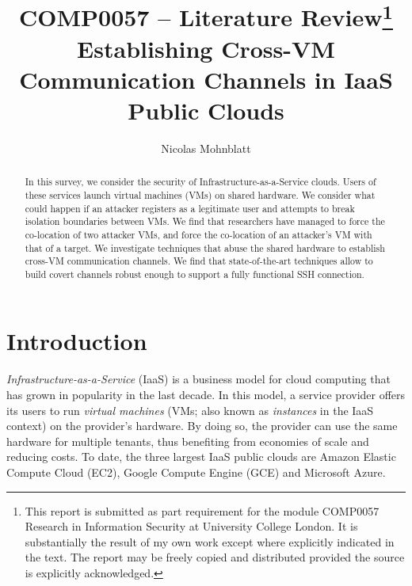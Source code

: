 \documentclass[orivec,envcountsame, a4paper, 11pt]{llncs}
\title{COMP0057 -- Literature Review\thanks{This report is submitted as part requirement for the module COMP0057 Research in Information Security at University College London. It is substantially the result of my own work except where explicitly indicated in the text. The report may be freely copied and distributed provided the source is explicitly acknowledged.} \\ \vspace{2mm}
\large Establishing Cross-VM Communication Channels in IaaS Public Clouds \\}
\author{Nicolas Mohnblatt}
\institute{
  UCL, \email{nicolas.mohnblatt19@ucl.ac.uk}
}
\begin{document}
\maketitle

\begin{abstract}
 In this survey, we consider the security of Infrastructure-as-a-Service clouds. Users of these services launch virtual machines (VMs) on shared hardware. We consider what could happen if an attacker registers as a legitimate user and attempts to break isolation boundaries between VMs. We find that researchers have managed to force the co-location of two attacker VMs, and force the co-location of an attacker's VM with that of a target. We investigate techniques that abuse the shared hardware to establish cross-VM communication channels. We find that state-of-the-art techniques allow to build covert channels robust enough to support a fully functional SSH connection.
\end{abstract}

\section*{Introduction}
\label{sec:introduction}

\begin{comment}
	- What are IaaS clouds and why popular? (explain that user can launch VMs. Def. VM and instances, cloud)
	- Security questions that come with sharing infrastructure
	- Present the threat model and explain goal of this survey (def. co-residence, covert and side channels)
	- Explain structure of the report
\end{comment}

\paragraph{} \textit{Infrastructure-as-a-Service} (IaaS) is a business model for cloud computing that has grown in popularity in the last decade. In this model, a service provider offers its users to run \textit{virtual machines} (VMs; also known as \textit{instances} in the IaaS context) on the provider's hardware. By doing so, the provider can use the same hardware for multiple tenants, thus benefiting from economies of scale and reducing costs. To date, the three largest IaaS public clouds are Amazon Elastic Compute Cloud (EC2), Google Compute Engine (GCE) and Microsoft Azure.
\end{document}
